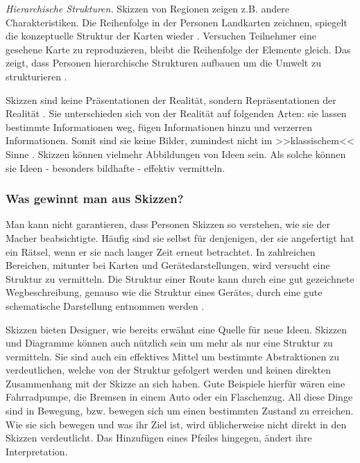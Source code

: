\medskip \emph{Hierarchische Strukturen.} Skizzen von Regionen zeigen z.B. andere Charakteristiken. Die Reihenfolge in der Personen Landkarten zeichnen, spiegelt die konzeptuelle Struktur der Karten wieder \citep{Taylor:1992}. Versuchen Teilnehmer eine gesehene Karte zu reproduzieren, bleibt die Reihenfolge der Elemente gleich. Das zeigt, dass Personen hierarchische Strukturen aufbauen um die Umwelt zu strukturieren \citep{Tversky:2002}.

\medskip Skizzen sind keine Präsentationen der Realität, sondern Repräsentationen der Realität \citep{Tversky:1999}. Sie unterschieden sich von der Realität auf folgenden Arten: sie lassen bestimmte Informationen weg, fügen Informationen hinzu und verzerren Informationen. Somit sind sie keine Bilder, zumindest nicht im >>klassischem<< Sinne \citep{Kosslyn:1980}. Skizzen können vielmehr Abbildungen von Ideen sein. Als solche können sie Ideen - besonders bildhafte - effektiv vermitteln.

\subsubsection{Was gewinnt man aus Skizzen?} Man kann nicht garantieren, dass Personen Skizzen so verstehen, wie sie der Macher beabsichtigte. Häufig sind sie selbst für denjenigen, der sie angefertigt hat ein Rätsel, wenn er sie nach langer Zeit erneut betrachtet. %
In zahlreichen Bereichen, mitunter bei Karten und Gerätedarstellungen, wird versucht eine Struktur zu vermitteln. Die Struktur einer Route kann durch eine gut gezeichnete Wegbeschreibung, genauso wie die Struktur eines Gerätes, durch eine gute schematische Darstellung entnommen werden \citep{Heiser:2002}.

\medskip Skizzen bieten Designer, wie bereits erwähnt eine Quelle für neue Ideen. Skizzen und Diagramme können auch nützlich sein um mehr als nur eine Struktur zu vermitteln. Sie sind auch ein effektives Mittel um bestimmte Abstraktionen zu verdeutlichen, welche von der Struktur gefolgert werden und keinen direkten Zusammenhang mit der Skizze an sich haben. Gute Beispiele hierfür wären eine Fahrradpumpe, die Bremsen in einem Auto oder ein Flaschenzug. All diese Dinge sind in Bewegung, bzw. bewegen sich um einen bestimmten Zustand zu erreichen. Wie sie sich bewegen und was ihr Ziel ist, wird üblicherweise nicht direkt in den Skizzen verdeutlicht. Das Hinzufügen eines Pfeiles hingegen, ändert ihre Interpretation.


